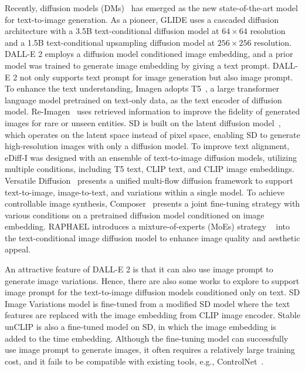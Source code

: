 \documentclass{article}
\begin{document}
Recently, diffusion models (DMs)~\cite{sohl2015deep,song2020denoising,song2020score,dhariwal2021diffusion} has emerged as the new state-of-the-art model for text-to-image generation. As a pioneer, GLIDE uses a cascaded diffusion architecture with a 3.5B text-conditional diffusion model at $64\times64$ resolution and a 1.5B text-conditional upsampling diffusion model at $256\times256$ resolution. DALL-E 2 employs a diffusion model conditioned image embedding, and a prior model was trained to generate image embedding by giving a text prompt. DALL-E 2 not only supports text prompt for image generation but also image prompt. To enhance the text understanding, Imagen adopts  T5~\cite{raffel2020exploring}, a large transformer language model pretrained on text-only data, as the text encoder of diffusion model. Re-Imagen~\cite{chen2022re} uses retrieved information to improve the fidelity of generated images for rare or unseen entities. SD is built on the latent diffusion model~\cite{rombach2022high}, which operates on the latent space instead of pixel space, enabling SD to generate high-resolution images with only a diffusion model. To improve text alignment, eDiff-I was designed with an ensemble of text-to-image diffusion models, utilizing multiple conditions, including T5 text, CLIP text, and CLIP image embeddings. Versatile Diffusion~\cite{xu2022versatile} presents a unified multi-flow diffusion framework to support text-to-image, image-to-text, and variations within a single model. To achieve controllable image synthesis, Composer~\cite{huang2023composer} presents a joint fine-tuning strategy with various conditions on a pretrained diffusion model conditioned on image embedding. RAPHAEL introduces a mixture-of-experts (MoEs) strategy ~\cite{shazeer2017outrageously,fedus2022switch} into the text-conditional image diffusion model to enhance image quality and aesthetic appeal.

An attractive feature of DALL-E 2 is that it can also use image prompt to generate image variations. Hence, there are also some works to explore to support image prompt for the text-to-image diffusion models conditioned only on text. SD Image Variations model is fine-tuned from a modified SD model where the text features are replaced with the image embedding from CLIP image encoder. Stable unCLIP is also a fine-tuned model on SD, in which the image embedding is added to the time embedding. Although the fine-tuning model can successfully use image prompt to generate images, it often requires a relatively large training cost, and it fails to be compatible with existing tools, e.g., ControlNet~\cite{zhang2023adding}.
\end{document}
